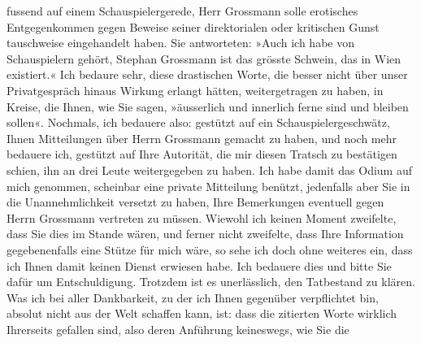 \begin{ledgroupsized}[t]{13cm}
                    fussend auf einem Schauspielergerede, Herr Grossmann solle erotisches Entgegenkommen gegen Beweise seiner
                    direktorialen oder kritischen Gunst tauschweise eingehandelt haben. Sie
                    antworteten: »Auch ich habe von Schauspielern gehört, Stephan Grossmann ist das grösste Schwein, das in Wien existiert.« Ich bedaure sehr, diese drastischen
                    Worte, die besser nicht über unser Privatgespräch hinaus Wirkung erlangt hätten,
                    weitergetragen zu haben, in Kreise, die Ihnen, wie Sie sagen, »äusserlich und
                    innerlich ferne sind und bleiben sollen«.\pend
           \pstart
           Nochmals, ich bedauere also: gestützt auf ein Schauspielergeschwätz, Ihnen
                    Mitteilungen über Herrn Grossmann gemacht zu
                    haben, und noch mehr bedauere ich, gestützt auf Ihre Autorität, die mir diesen
                    Tratsch zu bestätigen schien, ihn an drei Leute weitergegeben zu haben. Ich habe
                    damit das Odium auf mich genommen, scheinbar eine private Mitteilung benützt,
                    jedenfalls aber Sie in die Unannehmlichkeit versetzt zu haben, Ihre Bemerkungen
                    eventuell gegen Herrn Grossmann vertreten zu
                    müssen. Wiewohl ich keinen Moment zweifelte, dass Sie dies im Stande wären, und
                    ferner nicht zweifelte, dass Ihre Information gegebenenfalls eine Stütze für
                    mich wäre, so sehe ich doch ohne weiteres ein, dass ich Ihnen damit keinen
                    Dienst erwiesen habe. Ich bedauere dies und bitte Sie dafür um Entschuldigung.
                    Trotzdem ist es un{\pb}erlässlich, den Tatbestand zu
                    klären. Was ich bei aller Dankbarkeit, zu der ich Ihnen gegenüber verpflichtet
                    bin, absolut nicht aus der Welt schaffen kann, ist: dass die zitierten Worte
                    wirklich Ihrerseits gefallen sind, also deren Anführung keineswegs, wie Sie die

\end{ledgroupsized}
